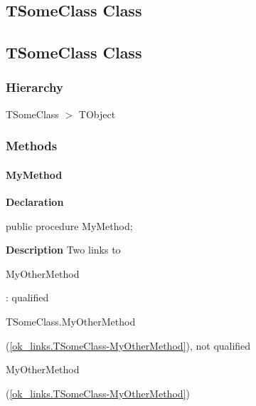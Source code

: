 \documentclass{report}
\newif\ifpdf
\begin{document}
\subsection*{\large{\textbf{TSomeClass Class}}\normalsize\hspace{1ex}\hrulefill}
\else
\subsection*{TSomeClass Class}
\fi
\label{ok_links.TSomeClass}
\subsubsection*{\large{\textbf{Hierarchy}}\normalsize\hspace{1ex}\hfill}
TSomeClass {$>$} TObject
\subsubsection*{\large{\textbf{Methods}}\normalsize\hspace{1ex}\hfill}
\paragraph*{MyMethod}\hspace*{\fill}

\label{ok_links.TSomeClass-MyMethod}
\begin{list}{}{
\setlength{\itemindent}{0cm}
\setlength{\listparindent}{0cm}
\setlength{\leftmargin}{\evensidemargin}
\addtolength{\leftmargin}{\tmplength}
\settowidth{\labelsep}{X}
\addtolength{\leftmargin}{\labelsep}
\setlength{\labelwidth}{\tmplength}
}
\item[\textbf{Declaration}\hfill]
\ifpdf
\begin{flushleft}
\fi
\begin{ttfamily}
public procedure MyMethod;\end{ttfamily}

\ifpdf
\end{flushleft}
\fi

\par
\item[\textbf{Description}]
Two links to \begin{ttfamily}MyOtherMethod\end{ttfamily} : qualified \begin{ttfamily}TSomeClass.MyOtherMethod\end{ttfamily}(\ref{ok_links.TSomeClass-MyOtherMethod}), not qualified \begin{ttfamily}MyOtherMethod\end{ttfamily}(\ref{ok_links.TSomeClass-MyOtherMethod})

\end{list}
\end{document}
